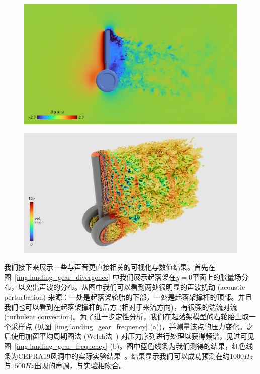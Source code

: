 \begin{figure}[!htbp]
  \centering
    \includegraphics[width=0.99\columnwidth]{figures/landing_gear_pressure.png}
  \label{img:landing_gear_pressure}
\end{figure}

\begin{figure}[!htbp]
  \centering
    \includegraphics[width=0.99\columnwidth]{figures/landing_gear_q_criterion.png}
  \label{img:landing_gear_q_criterion}
\end{figure}

我们接下来展示一些与声音更直接相关的可视化与数值结果。首先在图~\ref{img:landing_gear_divergence} 中我们展示起落架在$y=0$平面上的胀量场分布，以突出声波的分布。从图中我们可以看到两处很明显的声波扰动 (acoustic perturbation) 来源：一处是起落架轮胎的下部，一处是起落架撑杆的顶部。并且我们也可以看到在起落架撑杆的后方 (相对于来流方向)，有很强的湍流对流 (turbulent convection)。为了进一步定性分析，我们在起落架模型的右轮胎上取一个采样点 (见图~\ref{img:landing_gear_frequency} (a))，并测量该点的压力变化。之后使用加窗平均周期图法 (Welch法~\citep{1161901}) 对压力序列进行处理以获得频谱，见过可见图~\ref{img:landing_gear_frequency} (b)。图中蓝色线条为我们测得的结果，红色线条为CEPRA19风洞中的实际实验结果~\citep{doi:10.2514/6.2015-2993}。结果显示我们可以成功预测在约$1000Hz$与$1500Hz$出现的声调，与实验相吻合。

